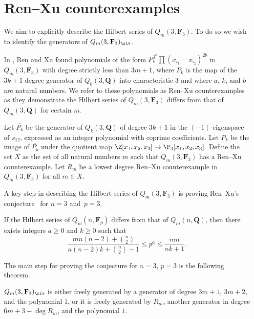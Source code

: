 \section{Ren--Xu counterexamples}\label{sec:renxu}

We aim to explicitly describe the Hilbert series of $Q_m(3,\mathbf{F}_3)$. To do so we wish to identify the generators of $Q_m(3,\mathbf{F}_3)_{\siv}$.

In \cite{Ren_2020}, Ren and Xu found polynomials of the form $P_k^{3^a}\prod (x_{i_1}-x_{i_2})^{2b}$ in $Q_m(3,\mathbf{F}_3)$ with degree strictly less than $3m+1$, where $P_k$ is the map of the $3k+1$ degree generator of $Q_k(3,\mathbf{Q})$ into characteristic $3$ and where $a$, $k$, and $b$ are natural numbers. We refer to these polynomials as Ren--Xu counterexamples as they demonstrate the Hilbert series of $Q_m(3,\mathbf{F}_3)$ differs from that of $Q_m(3,\mathbf{Q})$ for certain $m$.

\begin{Definition}
 Let $\overline{P_k}$ be the generator of $Q_k(3,\mathbf{Q})$ of degree $3k+1$ in the $(-1)$-eigenspace of $s_{12}$, expressed as an integer polynomial with coprime coefficients. Let $P_k$ be the image of $\overline{P_k}$ under the quotient map $\Z[x_1,x_2,x_3]\to\F_3[x_1,x_2,x_3]$. Define the set $X$ as the set of all natural numbers $m$ such that $Q_m(3,\mathbf{F}_3)$ has a Ren--Xu counterexample. Let $R_m$ be a lowest degree Ren--Xu counterexample in $Q_m(3,\mathbf{F}_3)$ for all $m\in X$.
\end{Definition}


A key step in describing the Hilbert series of $Q_m(3,\mathbf{F}_3)$ is proving Ren--Xu's conjecture~\cite{Ren_2020} for ${n=3}$ and~${p=3}$.

\begin{Conjecture}\label{conj:ren}
 If the Hilbert series of $Q_m(n,\mathbf{F}_p)$ differs from that of $Q_m(n,\mathbf{Q})$, then there exists integers $a\geq 0$ and $k\geq 0$ such that
 \[\frac{mn(n-2)+\binom{n}{2}}{n(n-2)k+\binom{n}{2}-1}\leq p^a\leq \frac{mn}{nk+1}.\]
\end{Conjecture}

The main step for proving the conjecture for $n=3$, $p=3$ is the following theorem.

\begin{Theorem}\label{justRens}
 $Q_m(3,\mathbf{F}_3)_{\siv}$ is either freely generated by a generator of degree $3m+1$, $3m+2$, and the polynomial $1$, or it is freely generated by $R_m$, another generator in degree $6m+3-\deg R_m$, and the polynomial $1$.
\end{Theorem}

